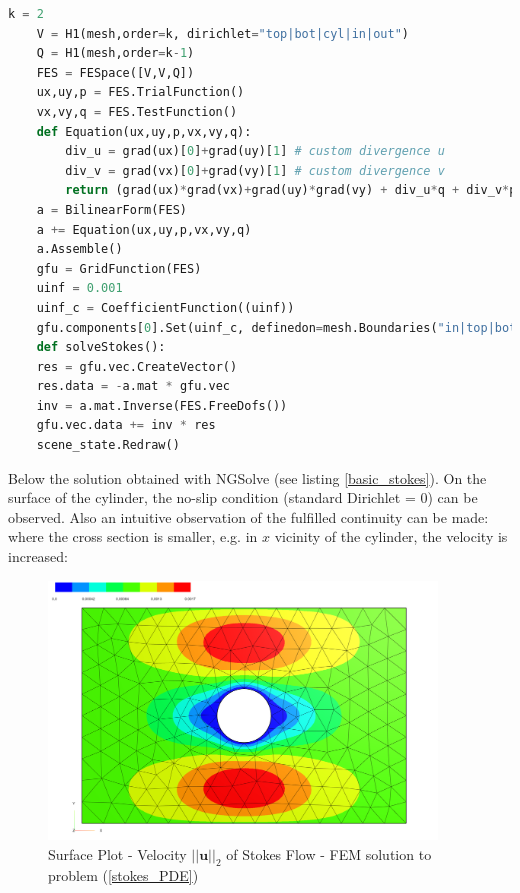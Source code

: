 \pagebreak

\begin{lstlisting}[language=Python, title=Basic Stokes PDE's with Python3 and NGSolve, label=basic_stokes]
    k = 2
    V = H1(mesh,order=k, dirichlet="top|bot|cyl|in|out")
    Q = H1(mesh,order=k-1)
    FES = FESpace([V,V,Q])
    ux,uy,p = FES.TrialFunction()
    vx,vy,q = FES.TestFunction()
    def Equation(ux,uy,p,vx,vy,q):
        div_u = grad(ux)[0]+grad(uy)[1] # custom divergence u
        div_v = grad(vx)[0]+grad(vy)[1] # custom divergence v
        return (grad(ux)*grad(vx)+grad(uy)*grad(vy) + div_u*q + div_v*p)* dx
    a = BilinearForm(FES)
    a += Equation(ux,uy,p,vx,vy,q)
    a.Assemble()
    gfu = GridFunction(FES)
    uinf = 0.001
    uinf_c = CoefficientFunction((uinf))
    gfu.components[0].Set(uinf_c, definedon=mesh.Boundaries("in|top|bot|out"))
    def solveStokes():
    res = gfu.vec.CreateVector()
    res.data = -a.mat * gfu.vec
    inv = a.mat.Inverse(FES.FreeDofs())
    gfu.vec.data += inv * res
    scene_state.Redraw()
\end{lstlisting}

Below the solution obtained with NGSolve (see listing \ref{basic_stokes}). On the surface of the cylinder, 
the no-slip condition (standard Dirichlet = 0) can be observed. Also an intuitive observation of the fulfilled continuity can be made:
where the cross section is smaller, e.g. in $x$ vicinity of the cylinder, the velocity is increased:

\begin{figure}[ht]
    \centering
    \includegraphics[width=0.92\textwidth]{figures/solution_stokes_basic.PNG}
	\caption{Surface Plot - Velocity $||\mathbf{u}||_2$ of Stokes Flow - FEM solution to problem (\ref{stokes_PDE})}
	\label{basic_stokes_flow_plot}
\end{figure}